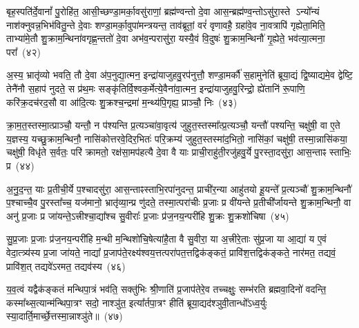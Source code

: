 {\anuvakamend[{म॒नु॒ष्य॒च॒रावु॑दपा॒त्रमु॑प॒ह्वये॑त द्विदेव॒त्याः᳚ षट्च॑त्वारिꣳशच्च}]}%

बृह॒स्पति॑र्दे॒वानां᳚ पु॒रोहि॑त॒ आसी॒च्छण्डा॒मर्का॒वसु॑राणां॒ ब्रह्म॑ण्वन्तो दे॒वा आस॒न्ब्रह्म॑ण्व॒न्तो\-ऽसु॑रा॒स्ते \-ऽन्यो᳚न्यं नाश॑क्नुवन्न॒भिभ॑वितु॒न्ते दे॒वाः शण्डा॒मर्का॒वुपा॑मन्त्रयन्त॒ ताव॑ब्रूतां॒ वरं॑ वृणावहै॒ ग्रहा॑वे॒व ना॒वत्रापि॑ गृह्येता॒मिति॒ ताभ्या॑मे॒तौ शु॒क्राम॒न्थिना॑वगृह्ण॒न्ततो॑ दे॒वा अभ॑व॒न्परासु॑रा॒ यस्यै॒वं वि॒दुषः॑ शु॒क्राम॒न्थिनौ॑ गृ॒ह्येते॒ भव॑त्या॒त्मना॒ परा᳚~(४२)

अ॒स्य॒ भ्रातृ॑व्यो भवति॒ तौ दे॒वा अ॑प॒नुद्या॒त्मन॒ इन्द्रा॑याजुहवु॒रप॑नुत्तौ॒ शण्डा॒मर्कौ॑ स॒हामुनेति॑ ब्रूया॒द्यं द्वि॒ष्याद्यमे॒व द्वेष्टि॒ तेनै॑नौ स॒हाप॑ नुदते॒ स प्र॑थ॒मः सङ्कृ॑तिर्वि॒श्वक॒र्मेत्ये॒वैना॑वा॒त्मन॒ इन्द्रा॑याजुहवु॒रिन्द्रो॒ ह्ये॑तानि॑ रू॒पाणि॒ करि॑क्र॒दच॑रद॒सौ वा आ॑दि॒त्यः शु॒क्रश्च॒न्द्रमा॑ म॒न्थ्य॑पि॒गृह्य॒ प्राञ्चौ॒ निः~(४३)

क्रा॒म॒त॒स्तस्मा॒त्प्राञ्चौ॒ यन्तौ॒ न प॑श्यन्ति प्र॒त्यञ्चा॑वा॒वृत्य॑ जुहुत॒स्तस्मा᳚त्प्र॒त्यञ्चौ॒ यन्तौ॑ पश्यन्ति॒ चक्षु॑षी॒ वा ए॒ते य॒ज्ञस्य॒ यच्छु॒क्राम॒न्थिनौ॒ नासि॑कोत्तरवे॒दिर॒भितः॑ परि॒क्रम्य॑ जुहुत॒स्तस्मा॑द॒भितो॒ नासि॑कां॒ चक्षु॑षी॒ तस्मा॒न्नासि॑कया॒ चक्षु॑षी॒ विधृ॑ते स॒र्वतः॒ परि॑ क्रामतो॒ रक्ष॑सा॒मप॑हत्यै दे॒वा वै याः प्राची॒राहु॑ती॒रजु॑हवु॒र्ये पु॒रस्ता॒दसु॑रा॒ आस॒न्ताꣴ स्ताभिः॒ प्र~(४४)

अ॒नु॒द॒न्त॒ याः प्र॒तीची॒र्ये प॒श्चादसु॑रा॒ आस॒न्ताꣴस्ताभि॒रपा॑नुदन्त॒ प्राची॑र॒न्या आहु॑तयो हू॒यन्ते᳚ प्र॒त्यञ्चौ॑ शु॒क्राम॒न्थिनौ॑ प॒श्चाच्चै॒व पु॒रस्ता᳚च्च॒ यज॑मानो॒ भ्रातृ॑व्या॒न्प्र णु॑दते॒ तस्मा॒त्परा॑चीः प्र॒जाः प्र वी॑यन्ते प्र॒तीची᳚र्जायन्ते शु॒क्राम॒न्थिनौ॒ वा अनु॑ प्र॒जाः प्र जा॑यन्ते॒\-ऽत्त्रीश्चा॒द्या᳚श्च सु॒वीराः᳚ प्र॒जाः प्र॑ज॒नय॒न्परी॑हि शु॒क्रः शु॒क्रशो॑चिषा~(४५)

सु॒प्र॒जाः प्र॒जाः प्र॑ज॒नय॒न्परी॑हि म॒न्थी म॒न्थिशो॑चि॒षेत्या॑है॒ता वै सु॒वीरा॒ या अ॒त्त्रीरे॒ताः सु॑प्र॒जा या आ॒द्या॑ य ए॒वं वेदा॒त्त्र्य॑स्य प्र॒जा जा॑यते॒ नाद्या᳚ प्र॒जा\-प॑ते॒रक्ष्य॑श्वय॒त्तत्परा॑पत॒त्तद्विक॑ङ्कतं॒ प्रावि॑श॒त्तद्विक॑ङ्कते॒ नार॑मत॒ तद्यवं॒ प्रावि॑श॒त् तद्यवे॑\-ऽरमत॒ तद्यव॑स्य~(४६)

य॒व॒त्वं यद्वैक॑ङ्कतं मन्थिपा॒त्रं भव॑ति॒ सक्तु॑भिः श्री॒णाति॑ प्र॒जा\-प॑तेरे॒व तच्चक्षुः॒ सम्भ॑रति ब्रह्मवा॒दिनो॑ वदन्ति॒ कस्मा᳚थ्स॒त्यान्म॑न्थिपा॒त्रꣳ सदो॒ नाश्ञु॑त॒ इत्या᳚र्तपा॒त्रꣳ हीति॑ ब्रूया॒द्यद॑श्ञुवी॒तान्धो᳚\-ऽध्व॒र्युः स्या॒दार्ति॒मार्च्छे॒त्तस्मा॒न्नाश्ञु॑ते॥~(४७)

{\anuvakamend[{आ॒त्मना॒ परा॒ निष्प्र शु॒क्रशो॑चिषा॒ यव॑स्य स॒प्तत्रिꣳ॑शच्च}]}%

